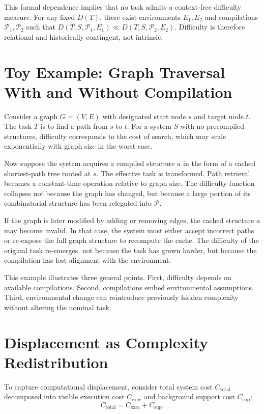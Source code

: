 \documentclass[12pt]{article}
\begin{document}
This formal dependence implies that no task admits a context-free difficulty measure. For any fixed $D(T)$, there exist environments $E_1, E_2$ and compilations $\mathcal{P}_1, \mathcal{P}_2$ such that $D(T, S, \mathcal{P}_1, E_1) \ll D(T, S, \mathcal{P}_2, E_2)$. Difficulty is therefore relational and historically contingent, not intrinsic.

\section{Toy Example: Graph Traversal With and Without Compilation}

Consider a graph $G = (V, E)$ with designated start node $s$ and target node $t$. The task $T$ is to find a path from $s$ to $t$. For a system $S$ with no precompiled structures, difficulty corresponds to the cost of search, which may scale exponentially with graph size in the worst case.

Now suppose the system acquires a compiled structure $a$ in the form of a cached shortest-path tree rooted at $s$. The effective task is transformed. Path retrieval becomes a constant-time operation relative to graph size. The difficulty function collapses not because the graph has changed, but because a large portion of its combinatorial structure has been relegated into $\mathcal{P}$.

If the graph is later modified by adding or removing edges, the cached structure $a$ may become invalid. In that case, the system must either accept incorrect paths or re-expose the full graph structure to recompute the cache. The difficulty of the original task re-emerges, not because the task has grown harder, but because the compilation has lost alignment with the environment.

This example illustrates three general points. First, difficulty depends on available compilations. Second, compilations embed environmental assumptions. Third, environmental change can reintroduce previously hidden complexity without altering the nominal task.

\section{Displacement as Complexity Redistribution}

To capture computational displacement, consider total system cost $C_{\text{total}}$ decomposed into visible execution cost $C_{\text{exec}}$ and background support cost $C_{\text{sup}}$:
\[
C_{\text{total}} = C_{\text{exec}} + C_{\text{sup}}.
\]
\end{document}

